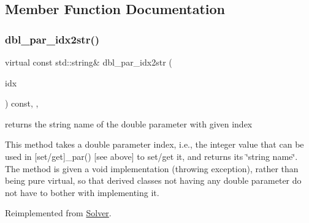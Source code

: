 \subsection{Member Function Documentation}
\mbox{\label{class_s_m_spp__di__unipi__it_1_1_c_d_a_solver_a93f1297e7910e91cc18b303376191026}} 
\subsubsection{\texorpdfstring{dbl\+\_\+par\+\_\+idx2str()}{dbl\_par\_idx2str()}}
{\footnotesize\ttfamily virtual const std\+::string\& dbl\+\_\+par\+\_\+idx2str (\begin{DoxyParamCaption}\item[{const \mbox{\hyperlink{class_s_m_spp__di__unipi__it_1_1_thin_compute_interface_aa3d710629ad8c434286726ad810c3b47}{idx\+\_\+type}}}]{idx }\end{DoxyParamCaption}) const\hspace{0.3cm}{\ttfamily [inline]}, {\ttfamily [override]}, {\ttfamily [virtual]}}



returns the string name of the double parameter with given index 

This method takes a double parameter index, i.\+e., the integer value that can be used in \mbox{[}set/get\mbox{]}\+\_\+par() \mbox{[}see above\mbox{]} to set/get it, and returns its \char`\"{}string name\char`\"{}. The method is given a void implementation (throwing exception), rather than being pure virtual, so that derived classes not having any double parameter do not have to bother with implementing it. 

Reimplemented from \mbox{\hyperlink{class_s_m_spp__di__unipi__it_1_1_solver_a93f1297e7910e91cc18b303376191026}{Solver}}.

\mbox{\label{class_s_m_spp__di__unipi__it_1_1_c_d_a_solver_a6d353ac3d1200d9bea89235da61bc4f3}} 
